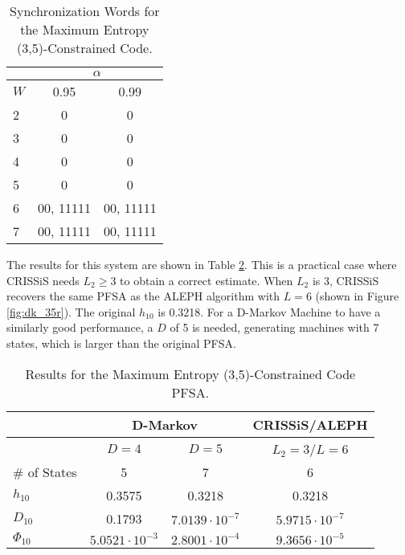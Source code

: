 {\begin{table}
\centering
\caption{Synchronization Words for the Maximum Entropy (3,5)-Constrained Code. \label{tab:dk35synch}}
\begin{tabular}{|l|c|c|}
\hline
 & \multicolumn{2}{c|}{\textbf{$\alpha$}}\\
 \hline
$W$ & 0.95 & 0.99 \\
\hline
2 & 0 & 0 \\ 
3 & 0 & 0 \\ 
4 & 0 & 0 \\ 
5 & 0  & 0 \\
6 & 00, 11111  & 00, 11111 \\
7 & 00, 11111  & 00, 11111 \\
 \hline
\end{tabular}
\end{table}

The results for this system are shown in Table \ref{tab:dk35}. This is a practical case where CRISSiS needs $L_2 \geq 3$ to obtain a correct estimate. When $L_2$ is 3, CRISSiS recovers the same PFSA as the ALEPH algorithm with $L=6$ (shown in Figure \ref{fig:dk_35r}). The original $h_{10}$ is 0.3218. For a D-Markov Machine to have a similarly good performance, a $D$ of 5 is needed, generating machines with 7 states, which is larger than the original PFSA.

\begin{table}
\centering
\caption{Results for the Maximum Entropy (3,5)-Constrained Code PFSA. \label{tab:dk35}}
\begin{tabular}{|l|c|c|c|}
\hline
 & \multicolumn{2}{c|}{D-Markov} & CRISSiS/ALEPH \\
 \hline
 & $D=4$ & $D=5$ & $L_2=3$/$L=6$\\
\hline
\# of States & 5 & 7 & 6 \\ 
$h_{10}$ & 0.3575 & 0.3218 &  0.3218 \\
$D_{10}$ & 0.1793 & $7.0139\cdot 10^{-7}$ & $5.9715\cdot 10^{-7}$\\
$\Phi_{10}$ & $5.0521\cdot 10^{-3}$ & $2.8001\cdot 10^{-4}$ & $9.3656\cdot 10^{-5}$ \\
 \hline
\end{tabular}
\end{table}

}
